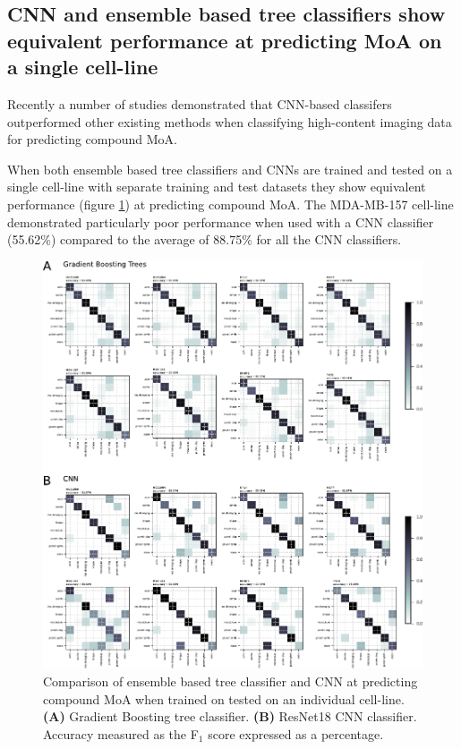 \documentclass[a4paper,11pt,twoside,openright]{scrbook}
\begin{document}
\subsection{CNN and ensemble based tree classifiers show equivalent performance at predicting MoA on a single cell-line}

Recently a number of studies demonstrated that CNN-based classifers outperformed other existing methods when classifying high-content imaging data for predicting compound MoA.

When both ensemble based tree classifiers and CNNs are trained and tested on a single cell-line with separate training and test datasets they show equivalent performance (figure \ref{figure:single_cell_line}) at predicting compound MoA.
The MDA-MB-157 cell-line demonstrated particularly poor performance when used with a CNN classifier (55.62\%) compared to the average of 88.75\% for all the CNN classifiers.


\begin{figure}
    \includegraphics[width=1.0\textwidth]{ch2SingleCellLine}
    \captionsetup{width=0.8\textwidth}
    \caption[Classifying MoA on a single cell-line]{Comparison of ensemble based tree classifier and CNN at predicting compound MoA when trained on tested on an individual cell-line.
    \textbf{(A)} Gradient Boosting tree classifier.
    \textbf{(B)} ResNet18 CNN classifier.
Accuracy measured as the F$_1$ score expressed as a percentage.
    }
    \label{figure:single_cell_line}
\end{figure}
\end{document}
